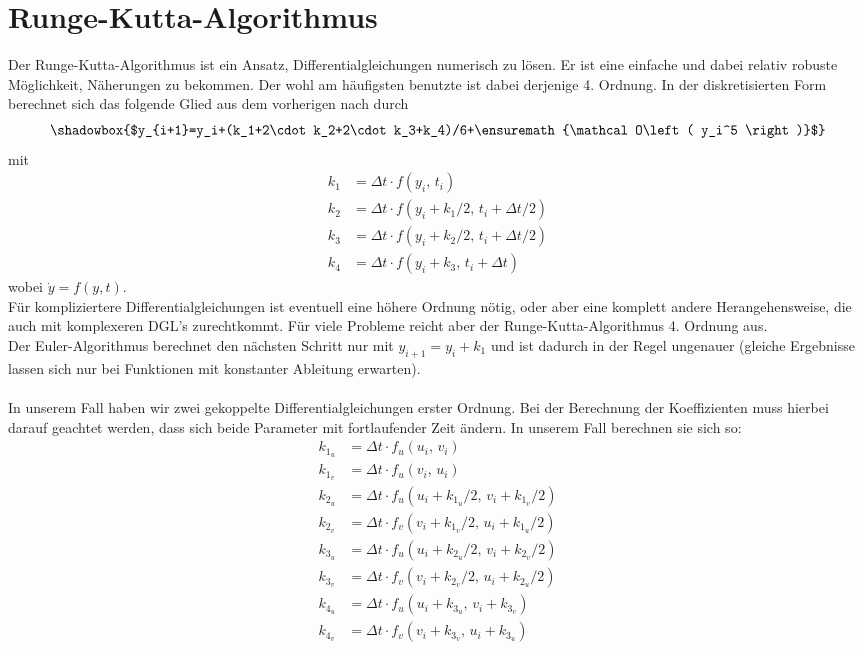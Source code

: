 \documentclass[12pt,a4paper,titlepage,headinclude,bibtotoc]{scrartcl}
\newcommand{\bachmann}[1]{\ensuremath{\mathcal O\left( #1 \right)}}
\begin{document}
\section{Runge-Kutta-Algorithmus}
Der Runge-Kutta-Algorithmus ist ein Ansatz, Differentialgleichungen numerisch zu lösen.
Er ist eine einfache und dabei relativ robuste Möglichkeit, Näherungen zu bekommen.
Der wohl am häufigsten benutzte ist dabei derjenige 4. Ordnung.
In der diskretisierten Form berechnet sich das folgende Glied aus dem vorherigen nach \cite[S.130]{scientificcomp} durch
$$\shadowbox{$y_{i+1}=y_i+(k_1+2\cdot k_2+2\cdot k_3+k_4)/6+\bachmann{y_i^5}$}$$ 
mit
\begin{align*}
k_1&=\Delta t\cdot f(y_i,\, t_i)\\
k_2&=\Delta t\cdot f(y_i+k_1/2,\, t_i+\Delta t/2)\\
k_3&=\Delta t\cdot f(y_i+k_2/2,\, t_i+\Delta t/2)\\
k_4&=\Delta t\cdot f(y_i+k_3,\, t_i+\Delta t)
\end{align*}
wobei $\dot y=f(y,t)$.\\
Für kompliziertere Differentialgleichungen ist eventuell eine höhere Ordnung nötig, oder aber eine komplett andere Herangehensweise, die auch mit komplexeren DGL's zurechtkommt.
Für viele Probleme reicht aber der Runge-Kutta-Algorithmus 4. Ordnung aus.\\
Der Euler-Algorithmus berechnet den nächsten Schritt nur mit $y_{i+1}=y_i+k_1$ und ist dadurch in der Regel ungenauer (gleiche Ergebnisse lassen sich nur bei Funktionen mit konstanter Ableitung erwarten).\\\\
In unserem Fall haben wir zwei gekoppelte Differentialgleichungen erster Ordnung.
Bei der Berechnung der Koeffizienten muss hierbei darauf geachtet werden, dass sich beide Parameter mit fortlaufender Zeit ändern.
In unserem Fall berechnen sie sich so:
\begin{align*}
k_{1_u}&=\Delta t\cdot f_u(u_i,\, v_i)\\
k_{1_v}&=\Delta t\cdot f_u(v_i,\, u_i)\\
k_{2_u}&=\Delta t\cdot f_u(u_i+k_{1_u}/2,\, v_i+k_{1_v}/2)\\
k_{2_v}&=\Delta t\cdot f_v(v_i+k_{1_v}/2,\, u_i+k_{1_u}/2)\\
k_{3_u}&=\Delta t\cdot f_u(u_i+k_{2_u}/2,\, v_i+k_{2_v}/2)\\
k_{3_v}&=\Delta t\cdot f_v(v_i+k_{2_v}/2,\, u_i+k_{2_u}/2)\\
k_{4_u}&=\Delta t\cdot f_u(u_i+k_{3_u},\, v_i+k_{3_v})\\
k_{4_v}&=\Delta t\cdot f_v(v_i+k_{3_v},\, u_i+k_{3_u})
\end{align*}
\end{document}
